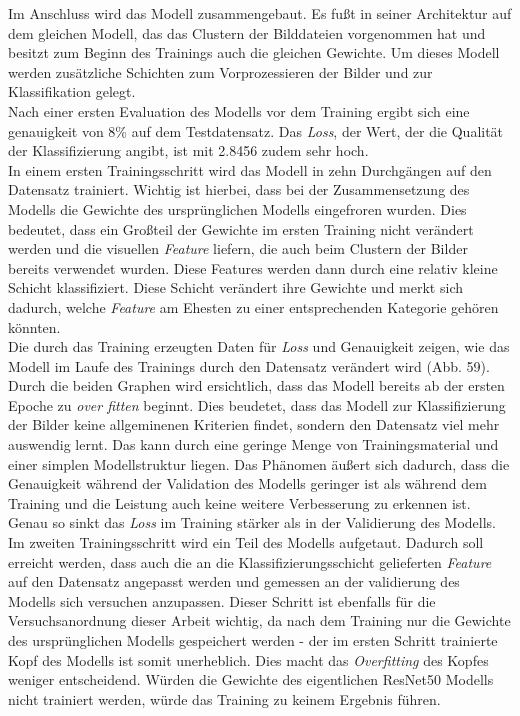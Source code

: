 \documentclass[a4paper,12pt,ngerman]{article}
\begin{document}
Im Anschluss wird das Modell zusammengebaut. Es fußt in seiner Architektur auf dem gleichen Modell, das das Clustern der Bilddateien vorgenommen hat und besitzt zum Beginn des Trainings auch die gleichen Gewichte. Um dieses Modell werden zusätzliche Schichten zum Vorprozessieren der Bilder und zur Klassifikation gelegt. \\
Nach einer ersten Evaluation des Modells vor dem Training ergibt sich eine genauigkeit von 8\% auf dem Testdatensatz. Das \textit{Loss}, der Wert, der die Qualität der Klassifizierung angibt, ist mit 2.8456 zudem sehr hoch. \\
In einem ersten Trainingsschritt wird das Modell in zehn Durchgängen auf den Datensatz trainiert. Wichtig ist hierbei, dass bei der Zusammensetzung des Modells die Gewichte des ursprünglichen Modells eingefroren wurden. Dies bedeutet, dass ein Großteil der Gewichte im ersten Training nicht verändert werden und die visuellen \textit{Feature} liefern, die auch beim Clustern der Bilder bereits verwendet wurden. Diese Features werden dann durch eine relativ kleine Schicht klassifiziert. Diese Schicht verändert ihre Gewichte und merkt sich dadurch, welche \textit{Feature} am Ehesten zu einer entsprechenden Kategorie gehören könnten. \\
Die durch das Training erzeugten Daten für \textit{Loss} und Genauigkeit zeigen, wie das Modell im Laufe des Trainings durch den Datensatz verändert wird (Abb. 59).  Durch die beiden Graphen wird ersichtlich, dass das Modell bereits ab der ersten Epoche zu \textit{over fitten} beginnt. Dies beudetet, dass das Modell zur Klassifizierung der Bilder keine allgeminenen Kriterien findet, sondern den Datensatz viel mehr auswendig lernt. Das kann durch eine geringe Menge von Trainingsmaterial und einer simplen Modellstruktur liegen. Das Phänomen äußert sich dadurch, dass die Genauigkeit während der Validation des Modells geringer ist als während dem Training und die Leistung auch keine weitere Verbesserung zu erkennen ist. Genau so sinkt das \textit{Loss} im Training stärker als in der Validierung des Modells. \\
Im zweiten Trainingsschritt wird ein Teil des Modells aufgetaut. Dadurch soll erreicht werden, dass auch die an die Klassifizierungsschicht gelieferten \textit{Feature} auf den Datensatz angepasst werden und gemessen an der validierung des Modells sich versuchen anzupassen. Dieser Schritt ist ebenfalls für die Versuchsanordnung dieser Arbeit wichtig, da nach dem Training nur die Gewichte des ursprünglichen Modells gespeichert werden - der im ersten Schritt trainierte Kopf des Modells ist somit unerheblich. Dies macht das \textit{Overfitting} des Kopfes weniger entscheidend. Würden die Gewichte des eigentlichen ResNet50 Modells nicht trainiert werden, würde das Training zu keinem Ergebnis führen. \\
\end{document}
